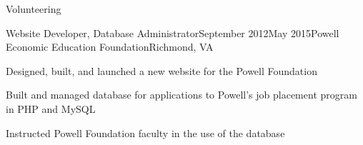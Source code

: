 \documentclass{resume} %
\begin{document}
\begin{rSection}{Volunteering}

\begin{rSubsection}{Website Developer, Database Administrator}{September 2012\textminus May 2015}{Powell Economic Education Foundation}{Richmond, VA}
\item[] Designed, built, and launched a new website for the Powell Foundation
\item[] Built and managed database for applications to Powell's job placement program in PHP and MySQL
\item[] Instructed Powell Foundation faculty in the use of the database
\end{rSubsection}
\end{rSection}











\end{document}
